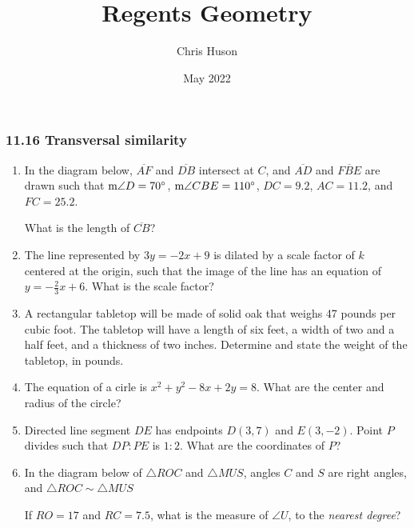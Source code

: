 \documentclass[12pt, oneside]{article}
\title{Regents Geometry}
\author{Chris Huson}
\date{May 2022}
\begin{document}
\subsubsection*{11.16 Transversal similarity}
\begin{enumerate}[itemsep=1.1cm]
\item In the diagram below, $\overline{AF}$ and $\overline{DB}$ intersect at $C$, and $\overline{AD}$ and $\overline{FBE}$ are drawn such that $\textup{m}\angle D = 70^\circ$, $\textup{m}\angle CBE = 110^\circ$, $DC=9.2$, $AC=11.2$, and $FC=25.2$.
  \begin{center}
  \end{center}
  What is the length of $\overline{CB}$?

\item The line represented by $3y=-2x+9$ is dilated by a scale factor of $k$ centered at the origin, such that the image of the line has an equation of $y= - \frac{2}{3}x+6$. What is the scale factor?

\item A rectangular tabletop will be made of solid oak that weighs 47 pounds per cubic foot. The tabletop will have a length of six feet, a width of two and a half feet, and a thickness of two inches. Determine and state the weight of the tabletop, in pounds.

\item The equation of a cirle is $x^2+y^2-8x+2y=8$. What are the center and radius of the circle?

\item Directed line segment $DE$ has endpoints $D(3, 7)$ and $E(3,-2)$. Point $P$ divides such that $DP:PE$ is $1:2$. What are the coordinates of $P$?

\newpage
\item In the diagram below of $\triangle ROC$ and $\triangle MUS$, angles $C$ and $S$ are right angles, and $\triangle ROC \sim \triangle MUS$
\begin{center}
\end{center}
If $RO=17$ and $RC=7.5$, what is the measure of $\angle U$, to the \emph{nearest degree}?


\end{enumerate}
\end{document}
